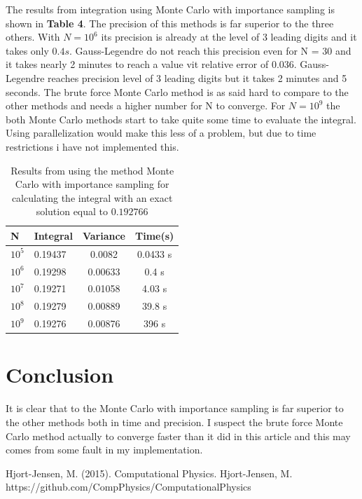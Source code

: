 \documentclass[twoside,twocolumn]{article}
\begin{document}
The results from integration using Monte Carlo with importance sampling is shown in \textbf{Table 4}. The precision of this methods is far superior to the three others. With $N = 10^6$ its precision is already at the level of 3 leading digits and it takes only $0.4 s$. Gauss-Legendre do not reach this precision even for N = 30 and it takes nearly 2 minutes to reach a value vit relative error of 0.036. Gauss-Legendre reaches precision level of 3 leading digits but it takes 2 minutes and 5 seconds. The brute force Monte Carlo method is as said hard to compare to the other methods and needs a higher number for N to converge. For $N = 10^9$ the both Monte Carlo methods start to take quite some time to evaluate the integral. Using parallelization would make this less of a problem, but due to time restrictions i have not implemented this.
\begin{table}[h]
\centering
\begin{tabular}{|l|l|c|c|}
\hline
N                     & Integral & \multicolumn{1}{l|}{Variance} & Time(s)  \\ \hline
$10^5$ & 0.19437  & 0.0082                        & 0.0433 s \\ \hline
$10^6$ & 0.19298  & 0.00633                       & 0.4 s    \\ \hline
$10^7$ & 0.19271  & 0.01058                       & 4.03 s   \\ \hline
$10^8$ & 0.19279  & 0.00889                       & 39.8 s   \\ \hline
$10^9$ & 0.19276  & 0.00876                       & 396 s    \\ \hline
\end{tabular}
\caption{Results from using the method Monte Carlo with importance sampling for calculating the integral with an exact solution equal to $0.192766$}
\end{table}

\section{Conclusion}
It is clear that to the Monte Carlo with importance sampling is far superior to the other methods both in time and precision. I suspect the brute force Monte Carlo method actually to converge faster than it did in this article and this may comes from some fault in my implementation. 

\begin{thebibliography}{99} %
Hjort-Jensen, M. (2015).
\newblock Computational Physics.
Hjort-Jensen, M.
\newblock https://github.com/CompPhysics/ComputationalPhysics

 
\end{thebibliography}

\end{document}
